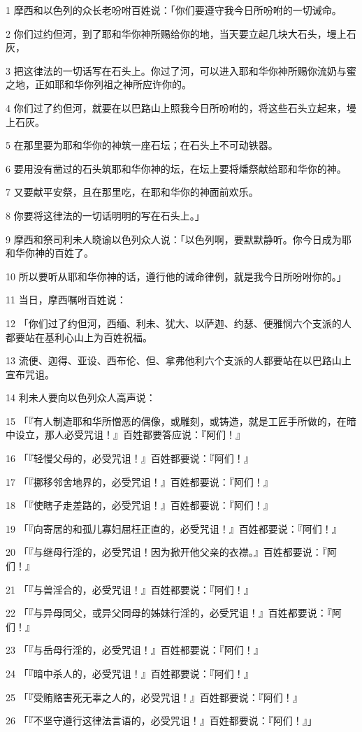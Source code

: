 \par 1 摩西和以色列的众长老吩咐百姓说：「你们要遵守我今日所吩咐的一切诫命。
\par 2 你们过约但河，到了耶和华你神所赐给你的地，当天要立起几块大石头，墁上石灰，
\par 3 把这律法的一切话写在石头上。你过了河，可以进入耶和华你神所赐你流奶与蜜之地，正如耶和华你列祖之神所应许你的。
\par 4 你们过了约但河，就要在以巴路山上照我今日所吩咐的，将这些石头立起来，墁上石灰。
\par 5 在那里要为耶和华你的神筑一座石坛；在石头上不可动铁器。
\par 6 要用没有凿过的石头筑耶和华你神的坛，在坛上要将燔祭献给耶和华你的神。
\par 7 又要献平安祭，且在那里吃，在耶和华你的神面前欢乐。
\par 8 你要将这律法的一切话明明的写在石头上。」
\par 9 摩西和祭司利未人晓谕以色列众人说：「以色列啊，要默默静听。你今日成为耶和华你神的百姓了。
\par 10 所以要听从耶和华你神的话，遵行他的诫命律例，就是我今日所吩咐你的。」
\par 11 当日，摩西嘱咐百姓说：
\par 12 「你们过了约但河，西缅、利未、犹大、以萨迦、约瑟、便雅悯六个支派的人都要站在基利心山上为百姓祝福。
\par 13 流便、迦得、亚设、西布伦、但、拿弗他利六个支派的人都要站在以巴路山上宣布咒诅。
\par 14 利未人要向以色列众人高声说：
\par 15 「『有人制造耶和华所憎恶的偶像，或雕刻，或铸造，就是工匠手所做的，在暗中设立，那人必受咒诅！』百姓都要答应说：『阿们！』
\par 16 「『轻慢父母的，必受咒诅！』百姓都要说：『阿们！』
\par 17 「『挪移邻舍地界的，必受咒诅！』百姓都要说：『阿们！』
\par 18 「『使瞎子走差路的，必受咒诅！』百姓都要说：『阿们！』
\par 19 「『向寄居的和孤儿寡妇屈枉正直的，必受咒诅！』百姓都要说：『阿们！』
\par 20 「『与继母行淫的，必受咒诅！因为掀开他父亲的衣襟。』百姓都要说：『阿们！』
\par 21 「『与兽淫合的，必受咒诅！』百姓都要说：『阿们！』
\par 22 「『与异母同父，或异父同母的姊妹行淫的，必受咒诅！』百姓都要说：『阿们！』
\par 23 「『与岳母行淫的，必受咒诅！』百姓都要说：『阿们！』
\par 24 「『暗中杀人的，必受咒诅！』百姓都要说：『阿们！』
\par 25 「『受贿赂害死无辜之人的，必受咒诅！』百姓都要说：『阿们！』
\par 26 「『不坚守遵行这律法言语的，必受咒诅！』百姓都要说：『阿们！』」


